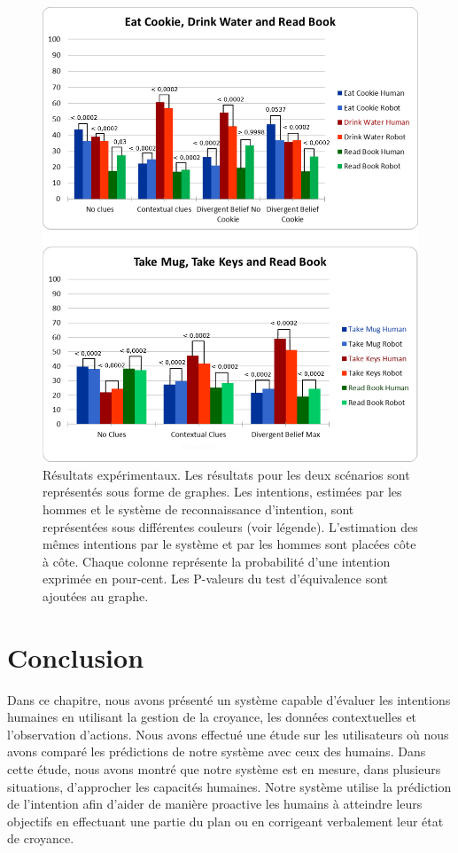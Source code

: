\documentclass[a4paper,11pt,twoside]{StyleThese}
\begin{document}
 \begin{figure}[h!]
	\centering
	\includegraphics[clip,scale=0.52]{img/pvalues1.pdf}
	\caption{Résultats expérimentaux. Les résultats pour les deux scénarios sont représentés sous forme de graphes. Les intentions, estimées par les hommes et le système de reconnaissance d'intention, sont représentées sous différentes couleurs (voir légende). L'estimation des mêmes intentions par le système et par les hommes sont placées côte à côte. Chaque colonne représente la probabilité d'une intention exprimée en pour-cent. Les P-valeurs du test d'équivalence sont ajoutées au graphe.}
	\label{fig:user_study_results}
  	\vspace{-16pt}
\end{figure}


\section{Conclusion}
Dans ce chapitre, nous avons présenté un système capable d'évaluer les intentions humaines en utilisant la gestion de la croyance, les données contextuelles et l'observation d'actions. Nous avons effectué une étude sur les utilisateurs où nous avons comparé les prédictions de notre système avec ceux des humains. Dans cette étude, nous avons montré que notre système est en mesure, dans plusieurs situations, d'approcher les capacités humaines. Notre système utilise la prédiction de l'intention afin d'aider de manière proactive les humains à atteindre leurs objectifs en effectuant une partie du plan ou en corrigeant verbalement leur état de croyance.
\end{document}
